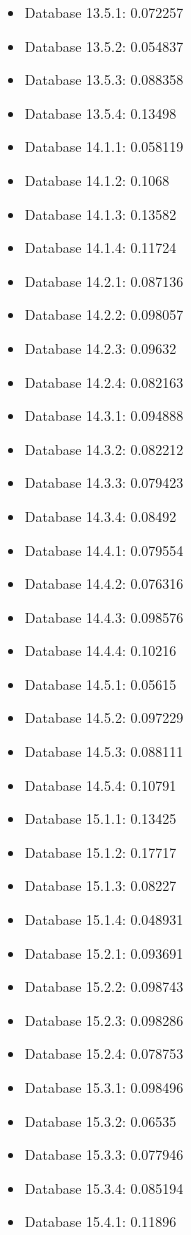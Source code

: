 \begin{itemize}
\item Database 13.5.1: 0.072257
\item Database 13.5.2: 0.054837
\item Database 13.5.3: 0.088358
\item Database 13.5.4: 0.13498
\item Database 14.1.1: 0.058119
\item Database 14.1.2: 0.1068
\item Database 14.1.3: 0.13582
\item Database 14.1.4: 0.11724
\item Database 14.2.1: 0.087136
\item Database 14.2.2: 0.098057
\item Database 14.2.3: 0.09632
\item Database 14.2.4: 0.082163
\item Database 14.3.1: 0.094888
\item Database 14.3.2: 0.082212
\item Database 14.3.3: 0.079423
\item Database 14.3.4: 0.08492
\item Database 14.4.1: 0.079554
\item Database 14.4.2: 0.076316
\item Database 14.4.3: 0.098576
\item Database 14.4.4: 0.10216
\item Database 14.5.1: 0.05615
\item Database 14.5.2: 0.097229
\item Database 14.5.3: 0.088111
\item Database 14.5.4: 0.10791
\item Database 15.1.1: 0.13425
\item Database 15.1.2: 0.17717
\item Database 15.1.3: 0.08227
\item Database 15.1.4: 0.048931
\item Database 15.2.1: 0.093691
\item Database 15.2.2: 0.098743
\item Database 15.2.3: 0.098286
\item Database 15.2.4: 0.078753
\item Database 15.3.1: 0.098496
\item Database 15.3.2: 0.06535
\item Database 15.3.3: 0.077946
\item Database 15.3.4: 0.085194
\item Database 15.4.1: 0.11896

\end{itemize}
